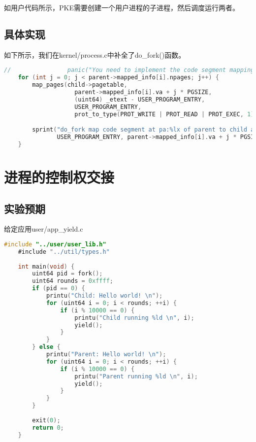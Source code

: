 如用户代码所示，PKE需要创建一个用户进程的子进程，然后调度运行两者。

\subsection{具体实现}

如下所示，我们在kernel/process.c中补全了do\_fork()函数。

\begin{lstlisting}[caption={do\_fork}, label={lst:do_fork}, language=C]
    //                panic("You need to implement the code segment mapping of child in lab3_1.\n");
    for (int j = 0; j < parent->mapped_info[i].npages; j++) {
        map_pages(child->pagetable, 
                    parent->mapped_info[i].va + j * PGSIZE, 
                    (uint64) _etext - USER_PROGRAM_ENTRY,
                    USER_PROGRAM_ENTRY, 
                    prot_to_type(PROT_WRITE | PROT_READ | PROT_EXEC, 1));

        sprint("do_fork map code segment at pa:%lx of parent to child at va:%lx.\n",
               USER_PROGRAM_ENTRY, parent->mapped_info[i].va + j * PGSIZE);
    }    
\end{lstlisting}

\section{进程的控制权交接}

\subsection{实验预期}

给定应用user/app\_yield.c

\begin{lstlisting}[caption={用户态应用app\_yield.c}, label={lst:app_yield}, language=C]
    #include "../user/user_lib.h"
    #include "../util/types.h"
    
    int main(void) {
        uint64 pid = fork();
        uint64 rounds = 0xffff;
        if (pid == 0) {
            printu("Child: Hello world! \n");
            for (uint64 i = 0; i < rounds; ++i) {
                if (i % 10000 == 0) {
                    printu("Child running %ld \n", i);
                    yield();
                }
            }
        } else {
            printu("Parent: Hello world! \n");
            for (uint64 i = 0; i < rounds; ++i) {
                if (i % 10000 == 0) {
                    printu("Parent running %ld \n", i);
                    yield();
                }
            }
        }
    
        exit(0);
        return 0;
    }
    
\end{lstlisting}


